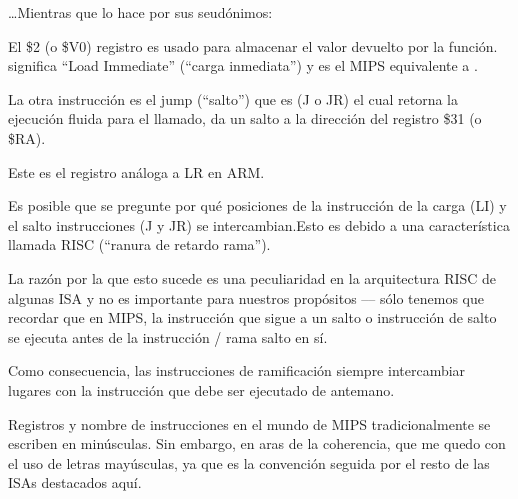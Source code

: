 

\dots Mientras que \IDA lo hace por sus seudónimos:



El \$2 (o \$V0) registro es usado para almacenar el valor devuelto por la función.
 significa ``Load Immediate'' (``carga inmediata'') y es el MIPS equivalente a \MOV.

La otra instrucción es el jump (``salto'') que es  (J o JR) el cual retorna la ejecución fluida para el llamado, da un salto a la dirección del registro \$31 (o \$RA).

Este es el registro análoga a \ac{LR} en ARM.

Es posible que se pregunte por qué posiciones de la instrucción de la carga (LI) y el salto instrucciones (J y JR) se intercambian.Esto es debido a una característica llamada RISC (``ranura de retardo rama'').

La razón por la que esto sucede es una peculiaridad en la arquitectura RISC de algunas ISA y no es importante para nuestros propósitos --– sólo tenemos que recordar que en MIPS, la instrucción que sigue a un salto o instrucción de salto se ejecuta antes de la instrucción / rama salto en sí.

Como consecuencia, las instrucciones de ramificación siempre intercambiar lugares con la instrucción que debe ser ejecutado de antemano.


Registros y nombre de instrucciones en el mundo de MIPS tradicionalmente se escriben en minúsculas.
Sin embargo, en aras de la  coherencia, que me quedo con el uso de letras mayúsculas, ya que es la convención seguida por el resto de las ISAs destacados aquí.

